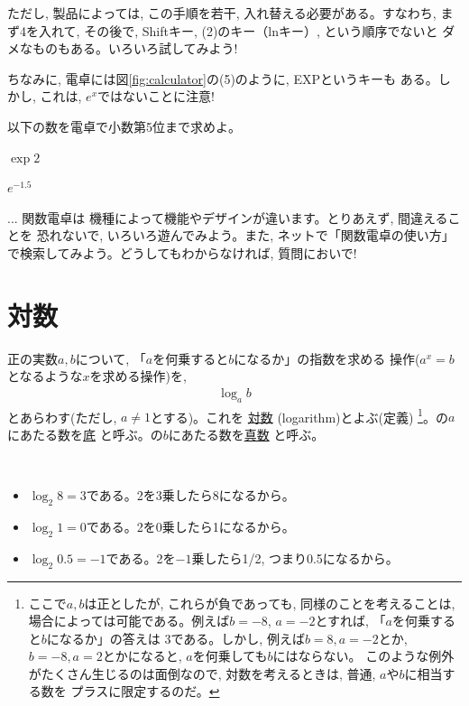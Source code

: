 ただし, 製品によっては, この手順を若干, 入れ替える必要がある。すなわち, 
まず4を入れて, その後で, Shiftキー, (2)のキー（lnキー）, という順序でないと
ダメなものもある。いろいろ試してみよう!

ちなみに, 電卓には図\ref{fig:calculator}の(5)のように, EXPというキーも
ある。しかし, これは, $e^x$ではないことに注意!

\begin{q}\label{q:alg_dentaku_exp} 
以下の数を電卓で小数第5位まで求めよ。
\begin{edaenumerate}
\item $\exp 2$
\item $e^{-1.5}$
\end{edaenumerate}
\end{q}

\begin{faq}{\small{} ... 関数電卓は
機種によって機能やデザインが違います。とりあえず, 間違えることを
恐れないで, いろいろ遊んでみよう。また, ネットで「関数電卓の使い方」
で検索してみよう。どうしてもわからなければ, 質問においで!}\end{faq}


\section{対数}

正の実数$a, b$について, 「$a$を何乗すると$b$になるか」の指数を求める
操作($a^x=b$となるような$x$を求める操作)を, 
\begin{eqnarray}
\log_a b\label{eq:taisuu00}
\end{eqnarray}
とあらわす(ただし, $a\neq 1$とする)。これを
\underline{対数} (logarithm)とよぶ(定義)
\footnote{ここで$a, b$は正としたが, これらが負であっても, 同様のことを考えることは, 
場合によっては可能である。例えば$b=-8$, $a=-2$とすれば, 「$a$を何乗すると$b$になるか」の答えは
3である。しかし, 例えば$b=8, a=-2$とか, $b=-8, a=2$とかになると, $a$を何乗しても$b$にはならない。
このような例外がたくさん生じるのは面倒なので, 対数を考えるときは, 普通, $a$や$b$に相当する数を
プラスに限定するのだ。}。の$a$にあたる数を\underline{底} と呼ぶ。の$b$にあたる数を\underline{真数} と呼ぶ。

\begin{exmpl}　
\begin{itemize}
\item $\log_2 8=3$である。2を3乗したら8になるから。
\item $\log_2 1=0$である。2を0乗したら1になるから。
\item $\log_2 0.5=-1$である。2を$-1$乗したら1/2, つまり0.5になるから。
\end{itemize}
\end{exmpl}

